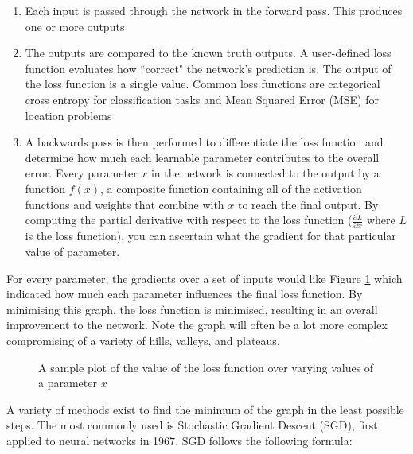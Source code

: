 \begin{enumerate}
    \item Each input is passed through the network in the forward pass. This produces one or more outputs
    \item The outputs are compared to the known truth outputs. A user-defined loss function evaluates how ``correct" the network's prediction is. The output of the loss function is a single value. Common loss functions are categorical cross entropy for classification tasks and Mean Squared Error (MSE) for location problems\cite{begmann-backpropagation}
    \item A backwards pass is then performed to differentiate the loss function and determine how much each learnable parameter contributes to the overall error. Every parameter $x$ in the network is connected to the output by a function $f(x)$, a composite function containing all of the activation functions and weights that combine with $x$ to reach the final output. By computing the partial derivative with respect to the loss function ($\frac{\partial L}{\partial x}$ where $L$ is the loss function), you can ascertain what the gradient for that particular value of parameter.
\end{enumerate}

For every parameter, the gradients over a set of inputs would like Figure \ref{fig:loss-graph} which indicated how much each parameter influences the final loss function. By minimising this graph, the loss function is minimised, resulting in an overall improvement to the network. Note the graph will often be a lot more complex compromising of a variety of hills, valleys, and plateaus.

\begin{figure}[h]
    \centering
    \caption{A sample plot of the value of the loss function over varying values of a parameter $x$}
    \label{fig:loss-graph}
\end{figure}

A variety of methods exist to find the minimum of the graph in the least possible steps. The most commonly used is Stochastic Gradient Descent (SGD)\cite{robbins1951stochastic}, first applied to neural networks in 1967\cite{shunichi1967theory}. SGD follows the following formula:

